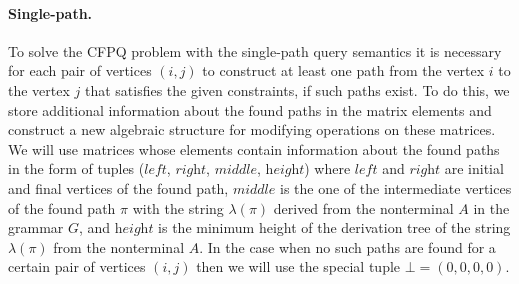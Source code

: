 \paragraph{Single-path.}
To solve the CFPQ problem with the single-path query semantics it is necessary for each pair of vertices $(i, j)$ to construct at least one path from the vertex $i$ to the vertex $j$ that satisfies the given constraints, if such paths exist. To do this, we store additional information about the found paths in the matrix elements and construct a new algebraic structure for modifying operations on these matrices. We will use matrices whose elements contain information about the found paths in the form of tuples ($\textit{left}$, $\textit{right}$, $\textit{middle}$, $\textit{height}$) where $\textit{left}$ and $\textit{right}$ are initial and final vertices of the found path, $\textit{middle}$ is the one of the intermediate vertices of the found path $\pi$ with the string $\lambda(\pi)$ derived from the nonterminal $A$ in the grammar $G$, and $\textit{height}$ is the minimum height of the derivation tree of the string $\lambda(\pi)$ from the nonterminal $A$. In the case when no such paths are found for a certain pair of vertices $(i, j)$ then we will use the special tuple $\bot = (0, 0, 0, 0)$.

